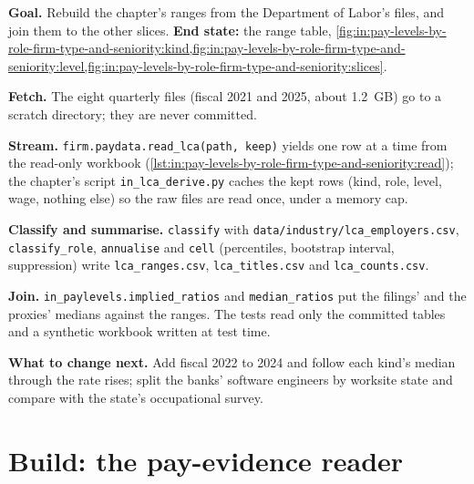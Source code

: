 \begin{tutorial}
\textbf{Goal.} Rebuild the chapter's ranges from the Department of Labor's files, and join them to the other slices.
\textbf{End state:} the range table,
\cref{fig:in:pay-levels-by-role-firm-type-and-seniority:kind,fig:in:pay-levels-by-role-firm-type-and-seniority:level,fig:in:pay-levels-by-role-firm-type-and-seniority:slices}.
\begin{tutsteps}
\item \textbf{Fetch.} The eight quarterly files (fiscal 2021 and 2025, about 1.2~GB) go to a scratch directory; they are
never committed.
\item \textbf{Stream.} \texttt{firm.paydata.read\_lca(path, keep)} yields one row at a time from the read-only workbook
(\cref{lst:in:pay-levels-by-role-firm-type-and-seniority:read}); the chapter's script
\texttt{in\_lca\_derive.py} caches the kept rows (kind, role, level, wage, nothing else) so the raw files are read once,
under a memory cap.
\label{lst:in:pay-levels-by-role-firm-type-and-seniority:read}
\item \textbf{Classify and summarise.} \texttt{classify} with \texttt{data/industry/lca\_employers.csv},
\texttt{classify\_role}, \texttt{annualise} and \texttt{cell} (percentiles, bootstrap interval, suppression) write
\texttt{lca\_ranges.csv}, \texttt{lca\_titles.csv} and \texttt{lca\_counts.csv}.
\item \textbf{Join.} \texttt{in\_paylevels.implied\_ratios} and \texttt{median\_ratios} put the filings'  and
the proxies' medians against the ranges. The tests read only the committed tables and a synthetic workbook written at test
time.
\end{tutsteps}
\end{tutorial}

\textbf{What to change next.} Add fiscal 2022 to 2024 and follow each kind's median through the rate rises; split the
banks' software engineers by worksite state and compare with the state's occupational survey.

\section{Build: the pay-evidence reader}\label{bld:in:pay-levels-by-role-firm-type-and-seniority:paydata}

